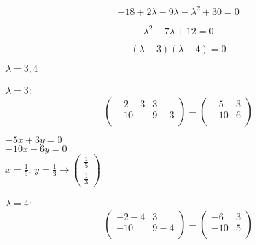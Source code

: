\documentclass[12pt]{article}
\begin{document}
\begin{enumerate}
\begin{enumerate}[label=(\alph*)]
            \begin{equation}
                -18 + 2\lambda - 9\lambda + \lambda^2 + 30 = 0 
            \end{equation}

            \begin{equation}
                \lambda^2 - 7\lambda + 12 = 0 
            \end{equation}

            \begin{equation}
                (\lambda - 3)(\lambda - 4) = 0
            \end{equation}

            $\lambda = 3, 4$

            $\lambda = 3$:
            \begin{equation}
                \begin{pmatrix}
                -2 - 3 & 3 \\
                -10 & 9 - 3 \\
                \end{pmatrix} = \begin{pmatrix}
                -5 & 3 \\
                -10 & 6 \\
                \end{pmatrix}
            \end{equation}

            $-5x + 3y = 0$ \\
            $-10x + 6y = 0$ \\

            $x = \frac{1}{5}$, $y = \frac{1}{3} \xrightarrow{} \begin{pmatrix}
                \frac{1}{5} \\
                \frac{1}{3}
            \end{pmatrix}$ 

            $\lambda = 4$:
            \begin{equation}
                \begin{pmatrix}
                -2 - 4 & 3 \\
                -10 & 9 - 4 \\
                \end{pmatrix} = \begin{pmatrix}
                -6 & 3 \\
                -10 & 5 \\
                \end{pmatrix}
            \end{equation}


\end{enumerate}
\end{enumerate}
\end{document}

